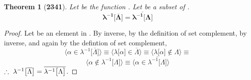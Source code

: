 \documentclass[preview]{standalone}
\newtheorem{theorem}{Theorem}
\begin{document}
\begin{theorem}[\textbf{2341}]
    Let \bm{$\lambda$} be the function 
    . 
    Let \bm{$\Lambda$} be a subset of . 
    \begin{equation*}
        \bm{
        \lambda ^{-1} \big[ \overline{\Lambda} \big] 
            = 
        \overline{ \lambda ^{-1} \big[ \Lambda \big]}
        }
    \end{equation*}
\end{theorem}

\begin{proof}
    Let \bm{$\alpha$} be an element in 
    .
    By  inverse, by the definition of set complement,
    by \bm{$\lambda$} inverse, and again by the defintion of set complement,
    \begin{equation*}
        \Big \langle
            \alpha \in \lambda ^{-1} \big[ \overline{\Lambda} \big]
        \Big \rangle
            \equiv
        \Big \langle
            \lambda \big[ \alpha \big] \in \overline{\Lambda}
        \Big \rangle
            \equiv
        \Big \langle
            \lambda \big[ \alpha \big] \notin \Lambda
        \Big \rangle
            \equiv
    \end{equation*}
    \begin{equation*}
        \Big \langle 
            \alpha 
                \notin 
            \lambda ^{-1} \big[ \Lambda \big]
        \Big \rangle
            \equiv
        \Big \langle
            \alpha 
                \in
            \overline{
                \lambda ^{-1} \big[ \Lambda \big]
            }
        \Big \rangle
    \end{equation*}
    $\therefore \text{\space} \relax{
        \lambda ^{-1} \big[ \overline{\Lambda} \big] 
            = 
        \overline{ \lambda ^{-1} \big[ \Lambda \big]}
    }$.
\end{proof}
\end{document}
